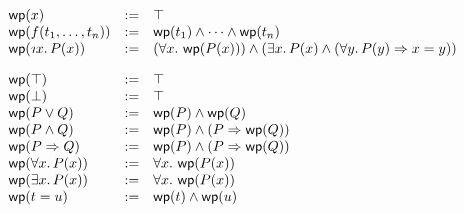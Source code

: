 \documentclass[10pt,a4paper]{article}
\begin{document}
\[
\begin{array}{lll}
  \jwp{\x} & := & \pTrue\\
  \jwp{\tFun{\f}{\t}{n}} & := & \pAnd{\jwp{\t_1}}{\pAnd{\cdots}{\jwp{\t_n}}}\\
  \jwp{\tDesc{\x}{\I}{\p(\x)}} & := &
       (\pForall{\x}{\I}{\jwp{\p(\x)}}) \wedge
       (\pExists{\x}{\I}{\p(\x)} \wedge
       (\pForall{\y}{\I}
               {\pImply{\p(\y)}{\x=\y}}))\\[10pt]

  \jwp{\pTrue} & := & \pTrue\\
  \jwp{\pFalse} & := & \pTrue\\
  \jwp{\pOr{\p}{\q}} & := & \pAnd{\jwp{\p}}{\jwp{\q}}\\
  \jwp{\pAnd{\p}{\q}} & := & \pAnd{\jwp{\p}}{(\pImply{\p}{\jwp{\q}})}\\
  \jwp{\pImply{\p}{\q}} & := & \pAnd{\jwp{\p}}{(\pImply{\p}{\jwp{\q}})}\\
  \jwp{\pForall{\x}{\I}{\p(\x)}} & := & \pForall{\x}{\I}{\jwp{\p(\x)}}\\
  \jwp{\pExists{\x}{\I}{\p(\x)}} & := & \pForall{\x}{\I}{\jwp{\p(\x)}}\\
  \jwp{\pEqual{\t}{\u}} & := & \pAnd{\jwp{\t}}{\jwp{\u}}\\[20pt]

\iffalse  
  \jtrans{\x} & := & \x\\
  \jtrans{\tFun{\f}{\t}{n}} & := & \f(\jtrans{\t_1},\ldots,\jtrans{\t_n})\\
  \jtrans{\tDesc{\x}{\I}{\p(\x)}} & := & \tDesc{\x}{\I}{\jtrans{\p(\x)}}\\[10pt]

  \jtrans{\pTrue} & := & \pTrue\\
  \jtrans{\pFalse} & := & \pFalse\\
  \jtrans{\pOr{\p}{\q}} & := & \pOr{(\pAnd{\jwp{\p}}{\jtrans{\p}})}{(\pAnd{\jwp{\q}}{\jtrans{\q}})}\\
  \jtrans{\pAnd{\p}{\q}} & := & \pAnd{\jtrans{\p}}{\jtrans{\q}}\\
  \jtrans{\pImply{\p}{\q}} & := & \pImply{\jtrans{\p}}{\jtrans{\q}}\\
  \jtrans{\pForall{\x}{\I}{\p}} & := & \pForall{\x}{\I}{\jtrans{\p}} \\
  \jtrans{\pExists{\x}{\I}{\p}} & := & \pExists{\x}{\I}{(\pAnd{\jwp{\p}}{\jtrans{\p}})}\\
  \jtrans{\pEqual{\t}{\u}} & := & \pEqual{\jtrans{\t}}{\jtrans{\u}}\\[10pt]
  
  \jtrans{\emptyCtx} & := & \emptyCtx\\
  \jtrans{\D,\p} & := & \jtrans{\D},\jtrans{\p}\\
\fi %
\end{array}
\]
\end{document}

